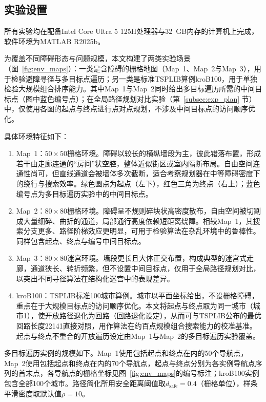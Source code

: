 \documentclass[lettersize,journal]{IEEEtran}
\begin{document}
\subsection{实验设置}

所有实验均在配备Intel Core Ultra 5 125H处理器与32~GB内存的计算机上完成，软件环境为MATLAB R2025b。

为覆盖不同障碍形态与问题规模，本文构建了两类实验场景（图~\textcolor{blue}{\ref{fig:env_maps}}）：一类是含障碍的栅格地图（Map~1、Map~2与Map~3），用于检验避障寻径与多目标点遍历；另一类是标准TSPLIB算例kroB100，用于单独检验大规模组合排序能力。其中Map~1与Map~2同时给出多目标遍历所需的中间目标点（图中蓝色编号点）；在全局路径规划对比实验（第~\textcolor{blue}{\ref{subsec:exp_plan}} 节）中，仅使用各图的起点与终点进行点对点规划，不涉及中间目标点的访问顺序优化。

具体环境特征如下：

\begin{enumerate}

\item Map~1：$50\times 50$栅格环境。障碍以较长的横纵墙段为主，彼此错落布置，形成若干由走廊连通的“房间”状空腔，整体近似街区或室内隔断布局。自由空间连通性尚可，但直线通道会被墙体多次截断，适合考察规划器在中等障碍密度下的绕行与搜索效率。绿色圆点为起点（左下），红色三角为终点（右上）；蓝色编号点为多目标遍历实验中的中间目标点。

\item Map~2：$80\times 80$栅格环境。障碍呈不规则碎块状高密度散布，自由空间被切割成大量细碎、曲折的通道，局部通行高度依赖短距离绕障。相较Map~1，其搜索分支更多、路径阶梯效应更明显，可用于检验算法在杂乱环境中的鲁棒性。同样包含起点、终点与编号中间目标点。

\item Map~3：$80\times 80$迷宫环境。墙段更长且大体正交布置，构成典型的迷宫式走廊，通道狭长、转折频繁，但不设置中间目标点，仅用于全局路径规划对比，以突出不同寻径算法在结构化迷宫中的表现差异。

\item kroB100：TSPLIB标准100城市算例。城市以平面坐标给出，不设栅格障碍，重点在于大规模目标点的访问顺序优化。本文将起点与终点取为同一城市（城市1），使开放路径退化为回路（回路退化设定），从而可与TSPLIB公布的最优回路长度22141直接对照，用作算法在约百点规模组合搜索能力的校准基准。起点与终点不重合的开放遍历设定由Map~1与Map~2的多目标遍历实验覆盖。

\end{enumerate}

多目标遍历实例的规模如下。Map~1使用包括起点和终点在内的50个导航点，Map~2使用包括起点和终点在内的70个导航点，起点与终点分别为各实例导航点序列的首末点，各导航点的栅格坐标见图~\textcolor{blue}{\ref{fig:env_maps}}的编号标注；kroB100实例包含全部100个城市。路径简化所用安全距离阈值取$d_{\mathrm{safe}} = 0.4$（栅格单位），样条平滑密度取默认值$\rho = 10$。
\end{document}
